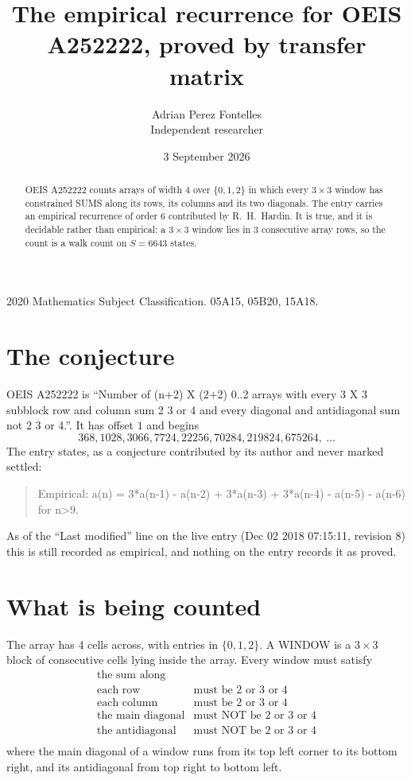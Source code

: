 \documentclass[11pt,a4paper]{article}
\title{The empirical recurrence for OEIS A252222, proved by transfer matrix}
\author{Adrian Perez Fontelles\\ \small Independent researcher}
\date{3 September 2026}
\theoremstyle{plain}
\theoremstyle{definition}
\begin{document}
\maketitle

\begin{abstract}
OEIS A252222 counts arrays of width $4$ over $\{0,1,2\}$ in which every $3\times3$ window has
constrained SUMS along its rows, its columns and its two diagonals. The entry carries an
empirical recurrence of order $6$ contributed by R.~H.~Hardin. It is true, and it is
decidable rather than empirical: a $3\times3$ window lies in $3$ consecutive array rows,
so the count is a walk count on $S=6643$ states.
\end{abstract}

\noindent\small 2020 Mathematics Subject Classification. 05A15, 05B20, 15A18.\normalsize

\section{The conjecture}

OEIS A252222 is ``Number of (n+2) X (2+2) 0..2 arrays with every 3 X 3 subblock row and column sum 2 3 or 4 and every diagonal and antidiagonal sum not 2 3 or 4.''. It has offset $1$ and begins
\[
368, 1028, 3066, 7724, 22256, 70284, 219824, 675264,\ \dots
\]
The entry states, as a conjecture contributed by its author and never marked settled:
\begin{quote}
Empirical: a(n) = 3*a(n-1) - a(n-2) + 3*a(n-3) + 3*a(n-4) - a(n-5) - a(n-6) for n>9.
\end{quote}
As of the ``Last modified'' line on the live entry (Dec 02 2018 07:15:11, revision 8) this is still
recorded as empirical, and nothing on the entry records it as proved.

\section{What is being counted}

The array has $4$ cells across, with entries in $\{0,1,2\}$. A WINDOW is a $3\times3$ block
of consecutive cells lying inside the array. Every window must satisfy
\[
\begin{array}{ll}
\text{the sum along} & \text{} \\[2pt]
\text{each row} & \text{must be 2 or 3 or 4} \\
\text{each column} & \text{must be 2 or 3 or 4} \\
\text{the main diagonal} & \text{must NOT be 2 or 3 or 4} \\
\text{the antidiagonal} & \text{must NOT be 2 or 3 or 4} \\
\end{array}
\]
where the main diagonal of a window runs from its top left corner to its bottom right, and its
antidiagonal from top right to bottom left.
\end{document}
